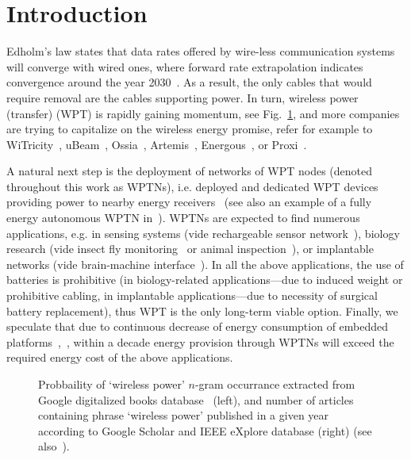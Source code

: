 \documentclass[11pt,draftclsnofoot,journal,onecolumn]{IEEEtran}
\begin{document}
\section{Introduction}
\label{sec:introduction}

Edholm's law states that data rates offered by wire-less communication systems will converge with wired ones, where forward rate extrapolation indicates convergence around the year 2030~\cite{cherry_spectrum_2004}. As a result, the only cables that would require removal are the cables supporting power. In turn, wireless power (transfer) (WPT) is rapidly gaining momentum, see Fig.~\ref{fig:wireless_power_popularity}, and more companies are trying to capitalize on the wireless energy promise, refer for example to WiTricity~\cite{witricity_website}, uBeam~\cite{ubeam_website}, Ossia~\cite{ossia_website}, Artemis~\cite{artemis_website}, Energous~\cite{energous_website}, or Proxi~\cite{proxi_website}. 

A natural next step is the deployment of networks of WPT nodes (denoted throughout this work as WPTNs), i.e. deployed and dedicated WPT devices providing power to nearby energy receivers~\cite{dai_tpds_2014,xie_wcom_2013} (see also an example of a fully energy autonomous WPTN in~\cite[Fig. 1]{wicaksono_vtc_2011}). WPTNs are expected to find numerous applications, e.g. in sensing systems (vide rechargeable sensor network~\cite{he_tmc_2013}), biology research (vide insect fly monitoring~\cite{thomas_jbcs_2012} or animal inspection~\cite{greene_unpublished_2010}), or implantable networks (vide brain-machine interface~\cite{holleman_biocas_2008}). In all the above applications, the use of batteries is prohibitive (in biology-related applications---due to induced weight or prohibitive cabling, in implantable applications---due to necessity of surgical battery replacement), thus WPT is the only long-term viable option. Finally, we speculate that due to continuous decrease of energy consumption of embedded platforms~\cite[Fig. 1]{long_cicc_2008},~\cite[p. 87]{patel_wcm_2010}, within a decade energy provision through WPTNs will exceed the required energy cost of the above applications.

\begin{figure}
\centering
{}
\caption{Probbaility of `wireless power' $n$-gram occurrance extracted from Google digitalized books database~\cite{michael_science_2011} (left), and number of articles containing phrase `wireless power' published in a given year according to Google Scholar and IEEE eXplore database (right) (see also~\cite[Fig. 1]{massa_procieee_2013}).}
\label{fig:wireless_power_popularity}
\end{figure}
\end{document}
